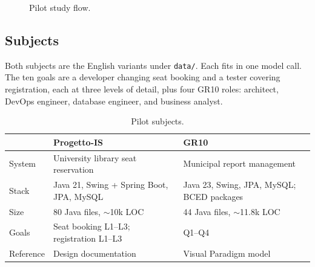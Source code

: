 \documentclass[11pt]{article}
\begin{document}
\begin{figure}[ht]
\caption{Pilot study flow.}
\label{fig:study}
\end{figure}

\subsection{Subjects}
Both subjects are the English variants under \texttt{data/}. Each fits in one model call. The ten goals are a developer changing seat booking and a tester covering registration, each at three levels of detail, plus four GR10 roles: architect, DevOps engineer, database engineer, and business analyst.

\begin{table}[h]
\centering
\small
\begin{tabularx}{\textwidth}{@{}lYY@{}}
\toprule
 & Progetto-IS & GR10 \\
\midrule
System & University library seat reservation & Municipal report management \\
Stack & Java 21, Swing + Spring Boot, JPA, MySQL & Java 23, Swing, JPA, MySQL; BCED packages \\
Size & 80 Java files, $\sim$10k LOC & 44 Java files, $\sim$11.8k LOC \\
Goals & Seat booking L1--L3; registration L1--L3 & Q1--Q4 \\
Reference & Design documentation & Visual Paradigm model \\
\bottomrule
\end{tabularx}
\caption{Pilot subjects.}
\label{tab:subjects}
\end{table}
\end{document}
